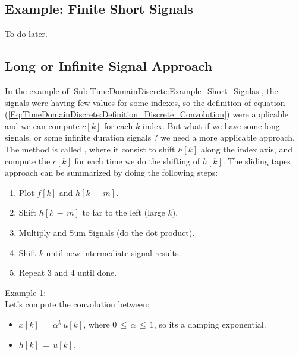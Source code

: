 \documentclass[12pt,a4paper]{book}
\begin{document}
\subsection{Example: Finite Short Signals}
\label{Sub:TimeDomainDiscrete:Example_Short_Signlas}

To do later.


\subsection{Long or Infinite Signal Approach}

In the example of \autoref{Sub:TimeDomainDiscrete:Example_Short_Signlas}, the signals were having few values for some indexes, so the definition of equation (\ref{Eq:TimeDomainDiscrete:Definition_Discrete_Convolution}) were applicable and we can compute $c[k]$ for each $k$ index. But what if we have some long signals, or some infinite duration signals ? we need a more applicable approach.\\


The method is called , where it consist to shift $h[k]$ along the index axis, and compute the $c[k]$ for each time we do the shifting of $h[k]$. The sliding tapes approach can be summarized by doing the following steps:

\begin{enumerate}

\item Plot $f[k]$ and $h[k \, - \, m]$.

\item Shift $h[k \, - \, m]$ to far to the left (large $k$).

\item Multiply and Sum Signals (do the dot product).

\item Shift $k$ until new intermediate signal results.

\item Repeat 3 and 4 until done.

\end{enumerate}

\underline{Example 1:}\\

Let's compute the convolution between:

\begin{itemize}
\item $x[k] \, = \, \alpha^k \, u[k]$, where $0 \, \leq \, \alpha \, \leq \, 1$, so its a damping exponential.

\item $h[k] \, =  \, u[k]$.
\end{itemize}
\end{document}
